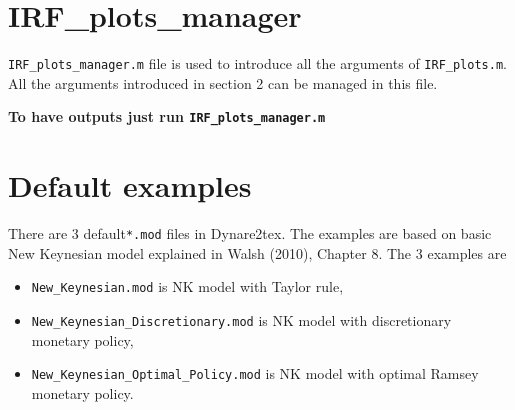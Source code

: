 \documentclass[11pt,a4paper]{article}
\begin{document}
\section{IRF\_plots\_manager}
\texttt{IRF\_plots\_manager.m} file is used to introduce all the arguments of \texttt{IRF_plots.m}. All the arguments introduced in section 2 can be managed in this file. 

{\bf To have outputs just run \texttt{IRF\_plots\_manager.m}} 

\section{Default examples}
There are 3 default\texttt{*.mod} files in Dynare2tex. The examples are based on basic New Keynesian model explained in Walsh (2010), Chapter 8. The 3 examples are
\begin{itemize}
\item \texttt{New_Keynesian.mod} is NK model with Taylor rule,
\item \texttt{New_Keynesian_Discretionary.mod} is NK model  with discretionary monetary policy, 
\item \texttt{New_Keynesian_Optimal_Policy.mod} is NK model with optimal Ramsey monetary policy. 
\end{itemize}
\end{document}
